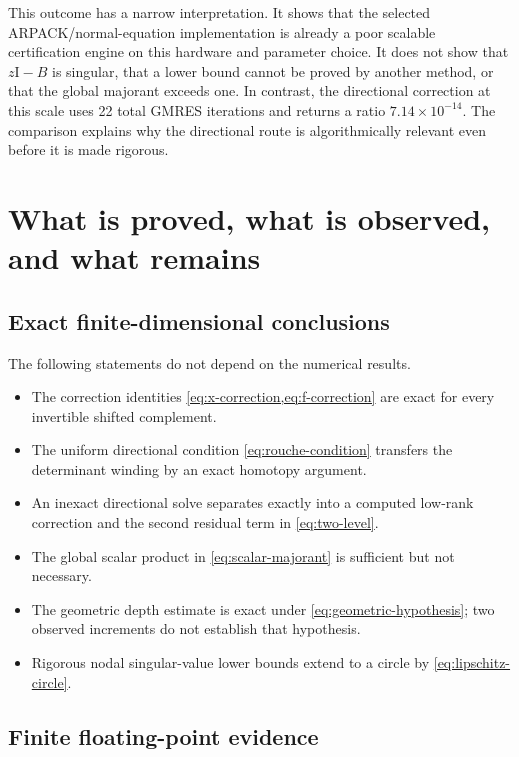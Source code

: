 \documentclass[11pt]{article}
\theoremstyle{definition}
\theoremstyle{remark}
\newcommand{\Id}{\mathrm I}
\begin{document}
This outcome has a narrow interpretation.  It shows that the selected
ARPACK/normal-equation implementation is already a poor scalable
certification engine on this hardware and parameter choice.  It does not
show that \(z\Id-B\) is singular, that a lower bound cannot be proved by
another method, or that the global majorant exceeds one.  In contrast, the
directional correction at this scale uses 22 total GMRES iterations and
returns a ratio \(7.14\times10^{-14}\).  The comparison explains why the
directional route is algorithmically relevant even before it is made
rigorous.

\section{What is proved, what is observed, and what remains}
\label{sec:status}

\subsection{Exact finite-dimensional conclusions}

The following statements do not depend on the numerical results.

\begin{itemize}
 \item The correction identities \cref{eq:x-correction,eq:f-correction}
 are exact for every invertible shifted complement.
 \item The uniform directional condition
 \cref{eq:rouche-condition} transfers the determinant winding by an exact
 homotopy argument.
 \item An inexact directional solve separates exactly into a computed
 low-rank correction and the second residual term in
 \cref{eq:two-level}.
 \item The global scalar product in \cref{eq:scalar-majorant} is sufficient
 but not necessary.
 \item The geometric depth estimate is exact under
 \cref{eq:geometric-hypothesis}; two observed increments do not establish
 that hypothesis.
 \item Rigorous nodal singular-value lower bounds extend to a circle by
 \cref{eq:lipschitz-circle}.
\end{itemize}

\subsection{Finite floating-point evidence}
\end{document}

